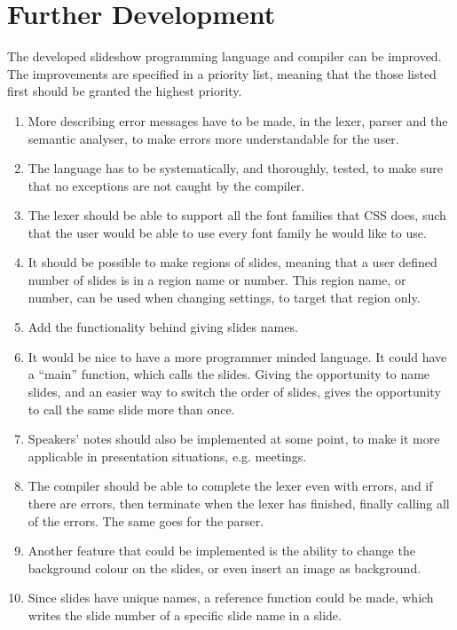 \chapter{Further Development}
\label{sec:furtherdev}
The developed slideshow programming language and compiler can be improved. The improvements are specified in a priority list, meaning that the those listed first should be granted the highest priority.

\begin{enumerate}
	\item More describing error messages have to be made, in the lexer, parser and the semantic analyser, to make errors more understandable for the user.
	\item The language has to be systematically, and thoroughly, tested, to make sure that no exceptions are not caught by the compiler.
	\item The lexer should be able to support all the font families that CSS does, such that the user would be able to use every font family he would like to use.
	\item It should be possible to make regions of slides, meaning that a user defined number of slides is in a region name or number. This region name, or number, can be used when changing settings, to target that region only.
	\item Add the functionality behind giving slides names.
	\item It would be nice to have a more programmer minded language. It could have a ``main'' function, which calls the slides. Giving the opportunity to name slides, and an easier way to switch the order of slides, gives the opportunity to call the same slide more than once.
	\item Speakers' notes should also be implemented at some point, to make it more applicable in presentation situations, e.g. meetings.
	\item The compiler should be able to complete the lexer even with errors, and if there are errors, then terminate when the lexer has finished, finally calling all of the errors. The same goes for the parser.
	\item Another feature that could be implemented is the ability to change the background colour on the slides, or even insert an image as background.
	\item Since slides have unique names, a reference function could be made, which writes the slide number of a specific slide name in a slide.
\end{enumerate}